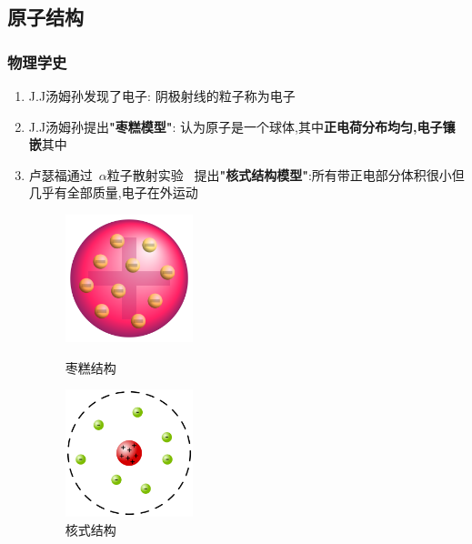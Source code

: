 \documentclass{article}
\begin{document}
\vspace{2em}

\subsection{原子结构}
\subsubsection{物理学史}
\begin{enumerate}[label = \arabic*{}.]
    \item J.J汤姆孙发现了电子: 阴极射线的粒子称为电子
    \item J.J汤姆孙提出\textbf{"枣糕模型"}: 认为原子是一个球体,其中\textbf{正电荷分布均匀,电子镶嵌}其中
    \item 卢瑟福通过\, $\alpha$粒子散射实验 \, 提出\textbf{"核式结构模型"}:所有带正电部分体积很小但几乎有全部质量,电子在外运动

          \begin{figure}[h]
              \centering
              \begin{minipage}{0.48\textwidth}
                  \centering
                  \includegraphics[width=10em]{./pictures/12.png}
                  \caption{枣糕结构}
              \end{minipage}
              \hfill
              \begin{minipage}{0.48\textwidth}
                  \centering
                  \includegraphics[width=10em]{./pictures/13.png}
                  \caption{核式结构}
              \end{minipage}
          \end{figure}
\end{enumerate}
\end{document}
